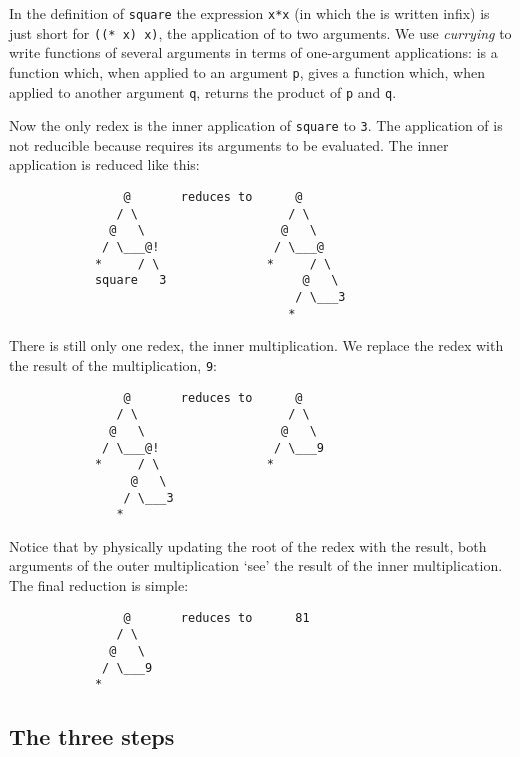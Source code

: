 In the definition of \mbox{\tt square} the expression \mbox{\tt x*x} (in which the \mbox{\tt *} is
written infix) is just short for \mbox{\tt ((*\ x)\ x)}, the application of \mbox{\tt *} to
two arguments. We use {\em currying\/} to write functions of several
arguments in terms of one-argument applications: \mbox{\tt *} is a function
which, when applied to an argument \mbox{\tt p}, gives a function which, when
applied to another argument \mbox{\tt q}, returns the product of \mbox{\tt p} and \mbox{\tt q}.

Now the only redex is the inner application of \mbox{\tt square} to \mbox{\tt 3}.  The
application of \mbox{\tt *} is not reducible because \mbox{\tt *} requires its arguments to
be evaluated.
The inner application is reduced like this:
\begin{verbatim}
                @       reduces to      @
               / \                     / \
              @   \                   @   \
             / \___@!                / \___@
            *     / \               *     / \
            square   3                   @   \
                                        / \___3
                                       *
\end{verbatim}
There is still only one redex, the inner multiplication.  We replace
the redex with the result of the multiplication, \mbox{\tt 9}:
\begin{verbatim}
                @       reduces to      @
               / \                     / \
              @   \                   @   \
             / \___@!                / \___9
            *     / \               *
                 @   \
                / \___3
               *
\end{verbatim}

Notice that by physically updating the root of the redex with the
result, both arguments of the outer multiplication `see' the result
of the inner multiplication.
The final reduction is simple:
\begin{verbatim}
                @       reduces to      81
               / \
              @   \
             / \___9
            *
\end{verbatim}

\subsection{The three steps}


